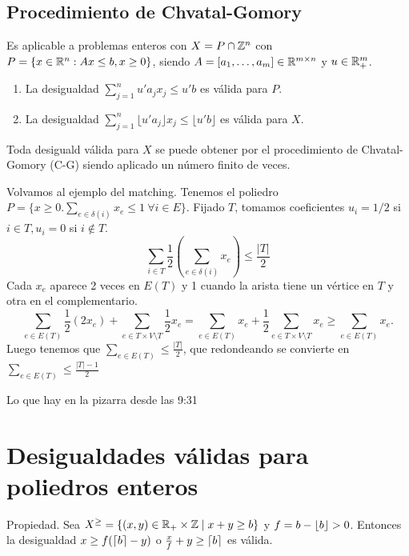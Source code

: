 \documentclass[MIOP.tex]{subfiles}
\begin{document}
\subsection{Procedimiento de Chvatal-Gomory}
Es aplicable a problemas enteros con $X=P\cap\mathbb{Z}^n$ con $P=\{x\in\mathbb{R}^n:Ax\leq b,x\geq 0\}$, siendo $A=[a_1,\dots,a_m]\in\mathbb{R}^{m\times n}$ y $u\in\mathbb{R}^m_+$. 
\begin{enumerate}
\item La desigualdad $\sum_{j=1}^nu'a_jx_j\leq u'b$ es válida para $P$.
\item La desigualdad $\sum_{j=1}^n\lfloor u'a_j\rfloor x_j\leq \lfloor u'b\rfloor$ es válida para $X$.
\end{enumerate}
\begin{teorema}
Toda desiguald válida para $X$ se puede obtener por el procedimiento de Chvatal-Gomory (C-G) siendo aplicado un número finito de veces.
\end{teorema}
\begin{ej}
Volvamos al ejemplo del matching. Tenemos el poliedro $P=\{x\geq 0.\sum_{e\in\delta(i)}x_e\leq 1\ \forall i\in E\}$. Fijado $T$, tomamos coeficientes $u_i=1/2$ si $i\in T, u_i=0$ si $i\notin T$. 
$$\sum_{i\in T}\frac{1}{2}(\sum_{e\in\delta(i)}x_e)\leq\frac{|T|}{2}$$
Cada $x_e$ aparece 2 veces en $E(T)$ y 1 cuando la arista tiene un vértice en $T$ y otra en el complementario.
$$\sum_{e\in E(T)}\frac{1}{2}(2x_e)+\sum_{e\in T\times V\setminus T}\frac{1}{2}x_e=\sum_{e\in E(T)}x_e+\frac{1}{2}\sum_{e\in T\times V\setminus T}x_e\geq \sum_{e\in E(T)}x_e.$$
Luego tenemos que $\sum_{e\in E(T)}\leq\frac{|T|}{2}$, que redondeando se convierte en $\sum_{e\in E(T)}\leq\frac{|T|-1}{2}$ 

\end{ej}











Lo que hay en la pizarra desde las 9:31


\section{Desigualdades válidas para poliedros enteros}
\begin{propi}
Propiedad. Sea $X^{\geq}=\{(x,y)\in\mathbb{R}_+\times \mathbb{Z} \mid x+y \geq b\}$ y $f= b-\left\lfloor{b}\right\rfloor>0$. Entonces la desigualdad $x\geq f(\left\lceil{b}\right\rceil-y)$ o $\frac{x}{f}+y\geq \left\lceil{b}\right\rceil$ es válida.
\end{propi}
\end{document}
